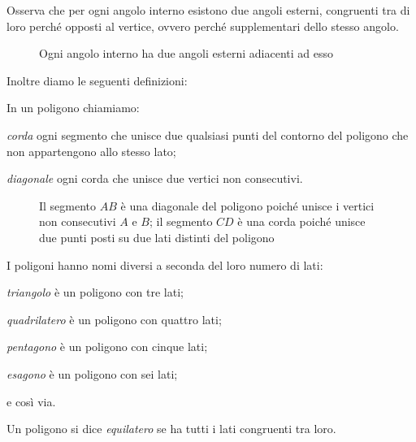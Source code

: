 Osserva che per ogni angolo interno esistono due angoli esterni, 
congruenti tra di loro perché opposti al vertice, ovvero perché 
supplementari dello stesso angolo.


\begin{inaccessibleblock}
 \begin{figure}[htb]
\centering
\caption{Ogni angolo interno ha due angoli esterni adiacenti ad esso}
\end{figure}
\end{inaccessibleblock}

Inoltre diamo le seguenti definizioni:
\begin{definizione}
In un poligono chiamiamo:
\begin{itemize*}
\item \emph{corda} ogni segmento che unisce due qualsiasi punti del 
contorno del poligono che non appartengono allo stesso lato;
\item \emph{diagonale} ogni corda che unisce due vertici non 
consecutivi.
\end{itemize*}
\end{definizione}


\begin{inaccessibleblock}
 \begin{figure}[htb]
\centering
\caption{Il segmento $AB$ è una diagonale del poligono poiché unisce 
i vertici non consecutivi $A$ e $B$; il segmento $CD$ è una corda 
poiché unisce due punti posti su due lati distinti del poligono}
\end{figure}
\end{inaccessibleblock}

I poligoni hanno nomi diversi a seconda del loro numero di lati:
\begin{itemize*}
\item \emph{triangolo} è un poligono con tre lati;
\item \emph{quadrilatero} è un poligono con quattro lati;
\item \emph{pentagono} è un poligono con cinque lati;
\item \emph{esagono} è un poligono con sei lati;
\item e così via.
\end{itemize*}

\begin{definizione}
Un poligono si dice \emph{equilatero} se ha tutti i lati congruenti 
tra loro.
\end{definizione}

